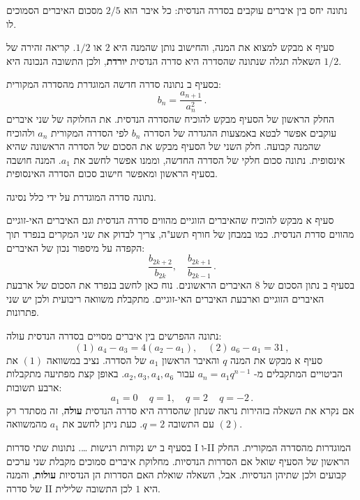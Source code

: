 \documentclass[12pt,a4paper]{article}
\begin{document}
\bigskip

\textbf{}
נתונה יחס בין איברים עוקבים בסדרה הנדסית: כל איבר הוא
$2/5$
מסכום האיברים הסמוכים לו.

סעיף א מבקש למצוא את המנה, והחישוב נותן שהמנה היא
$2$
או
$1/2$.
קריאה זהירה של השאלה תגלה שנתונה שהסדרה היא סדרה הנדסית
\textbf{יורדת}, 
ולכן התשובה הנכונה היא 
$1/2$.

בסעיף ב נתונה סדרה חדשה המוגדרת מהסדרה המקורית:
\[
b_n = \frac{a_{n+1}}{a_n^2}\,.
\]
החלק הראשון של הסעיף מבקש להוכיח שהסדרה הנדסית. את החלוקה של שני איברים עוקבים אפשר לבטא באמצעות ההגדרה של הסדרה
$b_n$
לפי הסדרה המקורית
$a_n$
ולהוכיח שהמנה קבועה. חלק השני של הסעיף מבקש את הסכום של הסדרה הראשונה שהיא אינסופית. נתונה סכום חלקי של הסדרה החדשה, וממנו אפשר לחשב את
$a_1$.
המנה חושבה בסעיף הראשון ומאפשר חישוב סכום הסדרה האינסופית.


\bigskip

\textbf{}
נתונה סדרה המוגדרת על ידי כלל נסיגה.

סעיף א מבקש להוכיח שהאיברים הזוגיים מהווים סדרה הנדסית וגם האיברים האי-זוגיים מהווים סדרת הנדסית. כמו במבחן של חורף תשע"ה, צריך לבדוק את שני המקרים בנפרד תוך הקפדה על מיספור נכון של האיברים:
\[
\frac{b_{2k+2}}{b_{2k}},\quad \frac{b_{2k+1}}{b_{2k-1}}\,.
\]
בסעיף ב נתון הסכום של 
$8$
האיברים הראשונים. נוח כאן לחשב בנפרד את הסכום של ארבעת האיברים הזוגיים וארבעת האיברים האי-זוגיים. מתקבלת משוואה ריבועית ולכן יש שני פתרונות.


\newpage

\textbf{}
נתונה ההפרשים בין איברים מסויים בסדרה הנדסית עולה:
\[
(1)\, a_4-a_3 = 4 (a_2-a_1),\quad (2)\, a_6 - a_1 = 31\,,
\]
סעיף א מבקש את המנה
$q$
והאיבר הראשון
$a_1$
של הסדרה. נציב במשוואה
$(1)$
 את הביטויים המתקבלים מ-%
$a_n=a_1q^{n-1}$
עבור
$a_2, a_3, a_4, a_6$.
באופן קצת מפתיעה מתקבלות ארבע תשובות:
\[
a_1 = 0\,\quad q=1,\quad q=2\, \quad q=-2\,.
\]
אם נקרא את השאלה בזהירות נראה שנתון שהסדרה היא סדרה הנדסית
\textbf{עולה},
זה מסתדר רק עם התשובה
$q=2$.
כעת ניתן לחשב את
$a_1$
מהמשוואה
$(2)$.

בסעיף ב יש נקודות רגישות
\ldots.
נתונות שתי סדרות I ו-II המוגדרות מהסדרה המקורית. החלק הראשון של הסעיף שואל אם הסדרות הנדסיות. מחלוקת איברים סמוכים מקבלת שני ערכים קבועים ולכן שתיהן הנדסיות. אבל, השאלה שואלת האם הסדרות הן הנדסיות 
\textbf{עולות},
והמנה של סדרה II היא
$1$
לכן התשובה שלילית.
\end{document}
